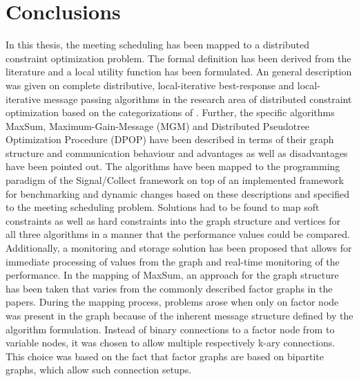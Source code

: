 \chapter{Conclusions}
\label{c:conclusions} 
In this thesis, the meeting scheduling has been mapped to a distributed constraint optimization problem. The formal definition has been derived from the literature and a local utility function has been formulated. An general description was given on complete distributive, local-iterative best-response and local-iterative message passing algorithms in the research area of distributed constraint optimization based on the categorizations of \cite{Chapman2011}. Further, the specific algorithms MaxSum, Maximum-Gain-Message (MGM) and  Distributed Pseudotree Optimization Procedure (DPOP) have been described in terms of their graph structure and communication behaviour and advantages as well as disadvantages have been pointed out. The algorithms have been mapped to the programming paradigm of the Signal/Collect framework on top of an implemented framework for benchmarking and dynamic changes based on these descriptions and specified to the meeting scheduling problem. Solutions had to be found to map soft constraints as well as hard constraints into the graph structure and vertices for all three algorithms in a manner that the performance values could be compared. Additionally, a monitoring and storage solution has been proposed that allows for immediate processing of values from the graph and real-time monitoring of the performance.
\newline\newline
 In the mapping of MaxSum, an approach for the graph structure has been taken that varies from the commonly described factor graphs in the papers. During the mapping process, problems arose when only on factor node was present in the graph because of the inherent message structure defined by the algorithm formulation. Instead of binary connections to a factor node from to variable nodes, it was chosen to allow multiple respectively k-ary connections. This choice was based on the fact that factor graphs are based on bipartite graphs, which allow such connection setups.
 \newline \newline

